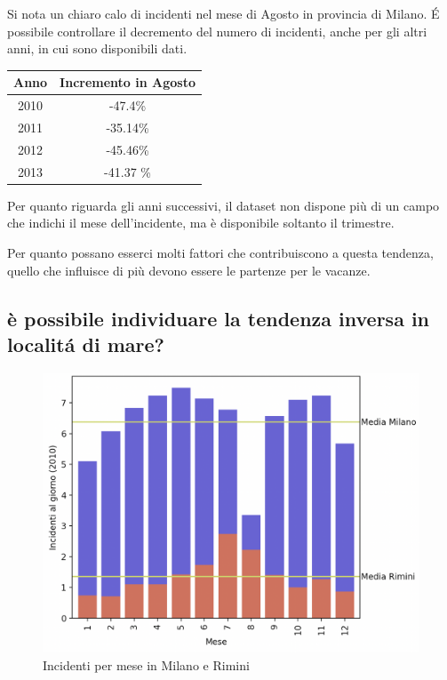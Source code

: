 \documentclass[a4paper]{report}
\begin{document}
Si nota un chiaro calo di incidenti nel mese di Agosto in provincia di Milano.
\'E possibile controllare il decremento del numero di incidenti, anche per gli altri anni, 
in cui sono disponibili dati.

\begin{center}
    \def\arraystretch{1.5}%
    \begin{tabular}{ |c|c| } 
    \hline
    Anno & Incremento in Agosto \\ 
    \hline
    2010 & -47.4\%  \\ 
    2011 & -35.14\% \\
    2012 & -45.46\% \\
    2013 & -41.37 \% \\
    \hline
    \end{tabular}
\end{center}

Per quanto riguarda gli anni successivi, il dataset non dispone più di un campo che indichi il mese 
dell'incidente, ma è disponibile soltanto il trimestre.


Per quanto possano esserci molti fattori che contribuiscono a questa tendenza, 
quello che influisce di più devono essere le partenze per le vacanze.

\subsection{è possibile individuare la tendenza inversa in localit\'a  di mare?}

\begin{figure}
    \includegraphics[width=\linewidth]{../src/incidenti/incidenti_senza_coords/mese_incidenti/milano_rimini.png}
    \caption{Incidenti per mese in Milano e Rimini}
    \label{fig:milano_rimini}
\end{figure}
\end{document}
